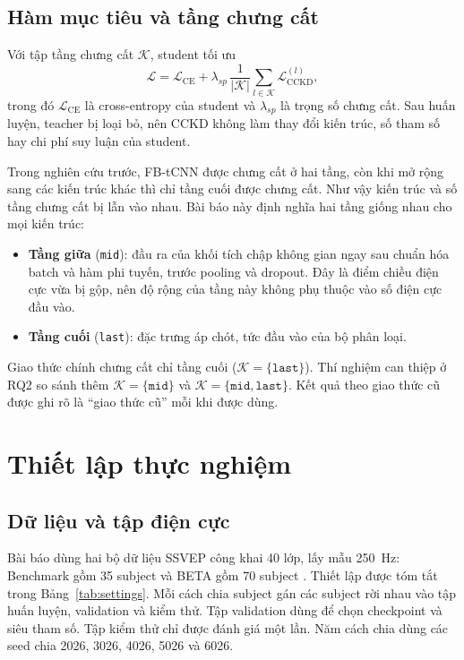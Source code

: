 \documentclass[10pt]{article} %
\begin{document}
\subsection{Hàm mục tiêu và tầng chưng cất}
\label{sec:training}

Với tập tầng chưng cất $\mathcal{K}$, student tối ưu
\begin{equation}
\mathcal{L} = \mathcal{L}_{\text{CE}} + \lambda_{sp} \, \frac{1}{\lvert \mathcal{K} \rvert} \sum_{l \in \mathcal{K}} \mathcal{L}_{\text{CCKD}}^{(l)},
\label{eq:total_loss}
\end{equation}
trong đó $\mathcal{L}_{\text{CE}}$ là cross-entropy của student và $\lambda_{sp}$ là trọng số chưng cất. Sau huấn luyện, teacher bị loại bỏ, nên CCKD không làm thay đổi kiến trúc, số tham số hay chi phí suy luận của student.

Trong nghiên cứu trước, FB-tCNN được chưng cất ở hai tầng, còn khi mở rộng sang các kiến trúc khác thì chỉ tầng cuối được chưng cất. Như vậy kiến trúc và số tầng chưng cất bị lẫn vào nhau. Bài báo này định nghĩa hai tầng giống nhau cho mọi kiến trúc:
\begin{itemize}
    \item \textbf{Tầng giữa} (\texttt{mid}): đầu ra của khối tích chập không gian ngay sau chuẩn hóa batch và hàm phi tuyến, trước pooling và dropout. Đây là điểm chiều điện cực vừa bị gộp, nên độ rộng của tầng này không phụ thuộc vào số điện cực đầu vào.
    \item \textbf{Tầng cuối} (\texttt{last}): đặc trưng áp chót, tức đầu vào của bộ phân loại.
\end{itemize}
Giao thức chính chưng cất chỉ tầng cuối ($\mathcal{K}=\{\texttt{last}\}$). Thí nghiệm can thiệp ở RQ2 so sánh thêm $\mathcal{K}=\{\texttt{mid}\}$ và $\mathcal{K}=\{\texttt{mid},\texttt{last}\}$. Kết quả theo giao thức cũ được ghi rõ là ``giao thức cũ'' mỗi khi được dùng.

\section{Thiết lập thực nghiệm}
\label{sec:setup}

\subsection{Dữ liệu và tập điện cực}

Bài báo dùng hai bộ dữ liệu SSVEP công khai 40 lớp, lấy mẫu 250~Hz: Benchmark gồm 35 subject \citep{wang2017benchmark} và BETA gồm 70 subject \citep{liu2020beta}. Thiết lập được tóm tắt trong Bảng~\ref{tab:settings}. Mỗi cách chia subject gán các subject rời nhau vào tập huấn luyện, validation và kiểm thử. Tập validation dùng để chọn checkpoint và siêu tham số. Tập kiểm thử chỉ được đánh giá một lần. Năm cách chia dùng các seed chia 2026, 3026, 4026, 5026 và 6026.
\end{document}

